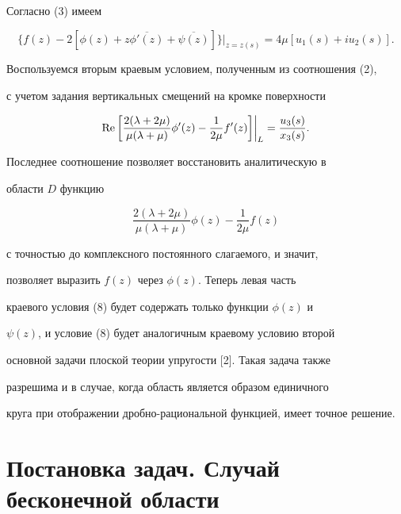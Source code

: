 Согласно (3) имеем


\begin{equation}


\{f(z) - 2[\phi(z) + z \overline{\phi'(z)} +


\overline{\psi(z)}]\}\vert_{z=z(s)} = 4\mu [u_1(s) + i u_2(s)].


\end{equation}


Воспользуемся вторым краевым условием, полученным из соотношения (2),


с учетом задания вертикальных смещений на кромке поверхности


$$


\re\bigg[\frac{2(\lambda + 2 \mu)}{\mu(\lambda + \mu)} \phi'(z) -


\frac{1}{2\mu} f'(z)\bigg]\bigg|_{L} = \frac{u_3(s)}{x_3(s)}.


$$


Последнее соотношение позволяет восстановить аналитическую в


области $D$ функцию


$$


\frac{2(\lambda + 2 \mu)}{\mu(\lambda + \mu)} \phi(z) -


\frac{1}{2\mu} f(z)


$$


с точностью до комплексного постоянного слагаемого, и значит,


позволяет выразить $f(z)$ через $\phi(z)$. Теперь левая часть


краевого условия (8) будет содержать только функции $\phi(z)$ и


$\psi(z)$, и условие (8) будет аналогичным краевому условию второй


основной задачи плоской теории упругости [2]. Такая задача также


разрешима и в случае, когда область является образом единичного


круга при отображении дробно-рациональной функцией, имеет точное решение.








\section{Постановка задач. Случай бесконечной области}





